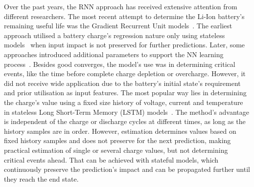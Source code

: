 %
Over the past years, the RNN approach has received extensive attention from different researchers.
The most recent attempt to determine the Li-Ion battery's remaining useful life was the Gradient Recurrent Unit models~\cite{song_lithium-ion_2018,javid_adaptive_2020,xiao_accurate_2019,jiao_gru-rnn_2020}.
The earliest approach utilised a battery charge's regression nature only using stateless models~\cite{song_lithium-ion_2018,jiao_gru-rnn_2020,xiao_accurate_2019} when input impact is not preserved for further predictions.
Later, some approaches introduced additional parameters to support the NN learning process~\cite{mamo_long_2020,jiao_gru-rnn_2020,javid_adaptive_2020}.
Besides good converges, the model's use was in determining critical events, like the time before complete charge depletion or overcharge.
However, it did not receive wide application due to the battery's initial state's requirement and prior utilisation as input features.
The most popular way lies in determining the charge's value using a fixed size history of voltage, current and temperature in stateless Long Short-Term Memory (LSTM) models~\cite{Chemali2017,mamo_long_2020,javid_adaptive_2020,zhang_deep_2020}.
The method's advantage is independent of the charge or discharge cycles at different times, as long as the history samples are in order.
However, estimation determines values based on fixed history samples and does not preserve for the next prediction, making practical estimation of single or several charge values, but not determining critical events ahead.
That can be achieved with stateful models, which continuously preserve the prediction's impact and can be propagated further until they reach the end state.

